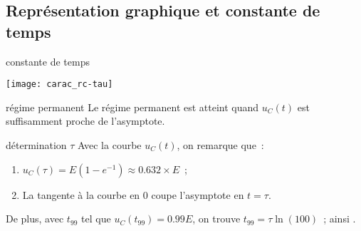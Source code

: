 \documentclass[../main/main.tex]{subfiles}
\begin{document}
\subsection{Représentation graphique et constante de temps}
\begin{tcbraster}[raster columns=2, raster equal height=rows]
    \begin{impl}[label=impl:tauRC]{constante de temps}
        \begin{center}
            \texttt{[image: carac\_rc-tau]}
        \end{center}
    \end{impl}
    \begin{tcolorbox}[blankest, raster multicolumn=1]%
        \begin{tcbraster}[raster columns=1]
            \begin{defi}[label=def:regmperma]{régime permanent}
                Le régime permanent est atteint quand $u_C(t)$ est
                suffisamment proche de l'asymptote.
            \end{defi}
            \begin{exem}[label=impl:déterm]{détermination $\tau$}
                Avec la courbe $u_C(t)$, on remarque que~:
                \begin{enumerate}
                    \item $u_C(\tau) = E \left( 1-e^{-1} \right) \approx
                        \num{0.632}\times E$~;
                    \item La tangente à la courbe en 0 coupe l'asymptote en
                        $t = \tau$.
                \end{enumerate}
                De plus, avec $t_{99}$ tel que $u_C(t_{99}) = \num{0.99}E$, on
                trouve $t_{99} = \tau\ln(100)$~; ainsi .
            \end{exem}
        \end{tcbraster}
    \end{tcolorbox}
\end{tcbraster}
\end{document}
